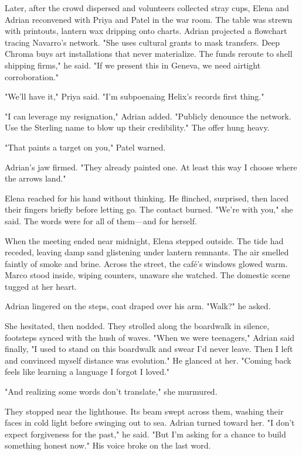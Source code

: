 Later, after the crowd dispersed and volunteers collected stray cups, Elena and Adrian reconvened with Priya and Patel in the war room. The table was strewn with printouts, lantern wax dripping onto charts. Adrian projected a flowchart tracing Navarro's network. "She uses cultural grants to mask transfers. Deep Chroma buys art installations that never materialize. The funds reroute to shell shipping firms," he said. "If we present this in Geneva, we need airtight corroboration."

"We'll have it," Priya said. "I'm subpoenaing Helix's records first thing."

"I can leverage my resignation," Adrian added. "Publicly denounce the network. Use the Sterling name to blow up their credibility." The offer hung heavy.

"That paints a target on you," Patel warned.

Adrian's jaw firmed. "They already painted one. At least this way I choose where the arrows land."

Elena reached for his hand without thinking. He flinched, surprised, then laced their fingers briefly before letting go. The contact burned. "We're with you," she said. The words were for all of them—and for herself.

When the meeting ended near midnight, Elena stepped outside. The tide had receded, leaving damp sand glistening under lantern remnants. The air smelled faintly of smoke and brine. Across the street, the café's windows glowed warm. Marco stood inside, wiping counters, unaware she watched. The domestic scene tugged at her heart.

Adrian lingered on the steps, coat draped over his arm. "Walk?" he asked.

She hesitated, then nodded. They strolled along the boardwalk in silence, footsteps synced with the hush of waves. "When we were teenagers," Adrian said finally, "I used to stand on this boardwalk and swear I'd never leave. Then I left and convinced myself distance was evolution." He glanced at her. "Coming back feels like learning a language I forgot I loved."

"And realizing some words don't translate," she murmured.

They stopped near the lighthouse. Its beam swept across them, washing their faces in cold light before swinging out to sea. Adrian turned toward her. "I don't expect forgiveness for the past," he said. "But I'm asking for a chance to build something honest now." His voice broke on the last word.

